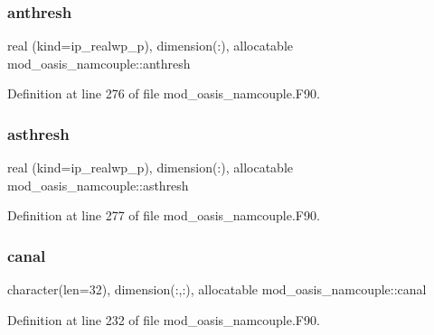 \subsubsection{\texorpdfstring{anthresh}{anthresh}}
{\footnotesize\ttfamily real (kind=ip\+\_\+realwp\+\_\+p), dimension(\+:), allocatable mod\+\_\+oasis\+\_\+namcouple\+::anthresh\hspace{0.3cm}{\ttfamily [private]}}



Definition at line 276 of file mod\+\_\+oasis\+\_\+namcouple.\+F90.

\mbox{\label{namespacemod__oasis__namcouple_a3e5d6e25f3a6b976b50b3c26f610f41a}} 
\subsubsection{\texorpdfstring{asthresh}{asthresh}}
{\footnotesize\ttfamily real (kind=ip\+\_\+realwp\+\_\+p), dimension(\+:), allocatable mod\+\_\+oasis\+\_\+namcouple\+::asthresh\hspace{0.3cm}{\ttfamily [private]}}



Definition at line 277 of file mod\+\_\+oasis\+\_\+namcouple.\+F90.

\mbox{\label{namespacemod__oasis__namcouple_a796058b6973a31bc719877570886be1a}} 
\subsubsection{\texorpdfstring{canal}{canal}}
{\footnotesize\ttfamily character(len=32), dimension(\+:,\+:), allocatable mod\+\_\+oasis\+\_\+namcouple\+::canal\hspace{0.3cm}{\ttfamily [private]}}



Definition at line 232 of file mod\+\_\+oasis\+\_\+namcouple.\+F90.

\mbox{\label{namespacemod__oasis__namcouple_a1fa86c01625d68460bf58d903a623011}} 
